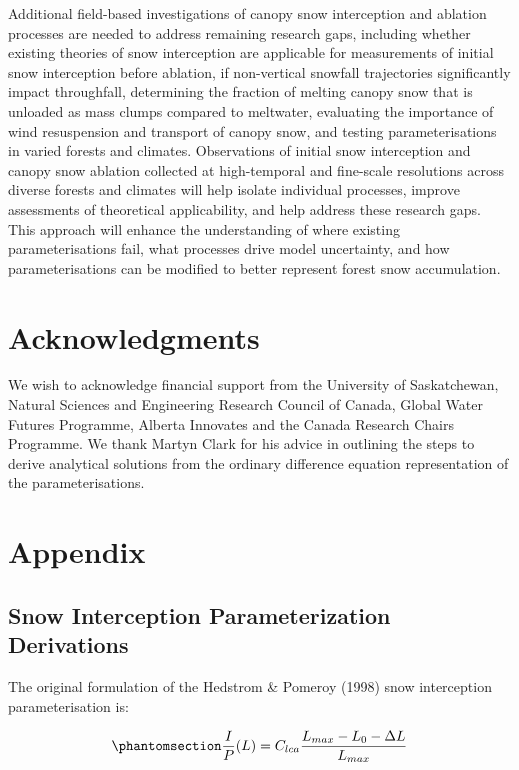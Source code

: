 \documentclass[
  letterpaper,
]{tex/uofsthesis-cs}
\begin{document}
Additional field-based investigations of canopy snow interception and
ablation processes are needed to address remaining research gaps,
including whether existing theories of snow interception are applicable
for measurements of initial snow interception before ablation, if
non-vertical snowfall trajectories significantly impact throughfall,
determining the fraction of melting canopy snow that is unloaded as mass
clumps compared to meltwater, evaluating the importance of wind
resuspension and transport of canopy snow, and testing parameterisations
in varied forests and climates. Observations of initial snow
interception and canopy snow ablation collected at high-temporal and
fine-scale resolutions across diverse forests and climates will help
isolate individual processes, improve assessments of theoretical
applicability, and help address these research gaps. This approach will
enhance the understanding of where existing parameterisations fail, what
processes drive model uncertainty, and how parameterisations can be
modified to better represent forest snow accumulation.

\section{Acknowledgments}\label{acknowledgments}

We wish to acknowledge financial support from the University of
Saskatchewan, Natural Sciences and Engineering Research Council of
Canada, Global Water Futures Programme, Alberta Innovates and the Canada
Research Chairs Programme. We thank Martyn Clark for his advice in
outlining the steps to derive analytical solutions from the ordinary
difference equation representation of the parameterisations.

\section{Appendix}\label{sec-review-appendix}

\subsection{Snow Interception Parameterization
Derivations}\label{snow-interception-parameterization-derivations}

The original formulation of the Hedstrom \& Pomeroy (1998) snow
interception parameterisation is:

\begin{equation}\phantomsection\label{eq-hp98-int-orig}{
\frac{I}{P}(L) = C_{lca} \frac{L_{max}-L_0-\Delta L}{L_{max}}
}\end{equation}
\end{document}
